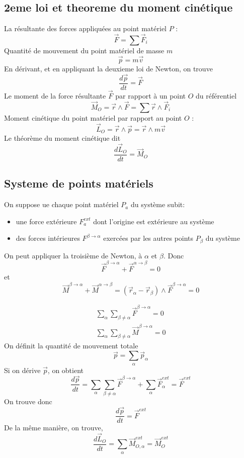 \documentclass[../main.tex]{subfiles}
\begin{document}
\subsection{2eme loi et theoreme du moment cinétique}
La résultante des forces appliquées au point matériel $P$ :
\[ 
\vec{F}= \sum \vec{F}_i
\]
Quantité de mouvement du point matériel de masse $m$ 
\[ 
\vec{p}= m \vec{v}
\]
En dérivant, et en appliquant la deuxieme loi de Newton, on trouve
\[ 
\frac{d \vec{p}}{dt}= \vec{F}
\]
Le moment de la force résultante $\vec{F}$ par rapport à un point $O$ du référentiel
\[ 
\vec{M}_O = \vec{r} \land \vec{F} = \sum \vec{r} \land \vec{F}_i
\]
Moment cinétique du point matériel par rapport au point $O$ : 
\[ 
\vec{L}_O = \vec{r} \land \vec{p} = \vec{r} \land m \vec{v}
\]
Le théorème du moment cinétique dit
\[ 
\frac{d \vec{L}_O}{dt}= \vec{M}_O
\]

\subsection{Systeme de points matériels}

On suppose ue chaque point matériel $P_a$ du système subit:
\begin{itemize}
\item une force extérieure $F_a^{ext}$ dont l'origine est extérieure au système
\item des forces intérieures $F^{\beta\to \alpha}$ exercées par les autres points $P_\beta$ du système 
\end{itemize}
On peut appliquer la troisième de Newton, à $\alpha$ et $\beta$.
Donc
\[ 
\vec{F}^{\beta\to\alpha} + \vec{F}^{\alpha\to \beta}=0
\]
et
\[ 
	\vec{M}^{\beta\to\alpha} + \vec{M}^{\alpha\to \beta}= ( \vec{r}_\alpha - \vec{r}_\beta) \land \vec{F}^{\beta \to \alpha}=0
\]

\begin{align*}
\sum_{\alpha} \sum_{\beta\neq \alpha}\vec{F}^{\beta\to\alpha} =0\\
\sum_{\alpha} \sum_{\beta\neq \alpha}\vec{M}^{\beta\to\alpha} =0
\end{align*}
On définit la quantité de mouvement totale
\[ 
\vec{p} = \sum_\alpha \vec{p}_\alpha
\]
Si on dérive $\vec{p}$, on obtient
\[ 
\frac{d \vec{p}}{dt} = \sum_\alpha \sum_{\beta\neq\alpha} \vec{F}^{\beta\to \alpha} + \sum_\alpha \vec{F}_\alpha ^{ext} = \vec{F}^{ext}
\]
On trouve donc
\[ 
\frac{d \vec{p}}{dt} = \vec{F}^{ext} 
\]
De la même manière, on trouve,
\[ 
\frac{d \vec{L}_O}{dt}= \sum_{\alpha} \vec{M}_{O,\alpha} ^{ext} = \vec{M}_{O} ^{ext}
\]
\end{document}
